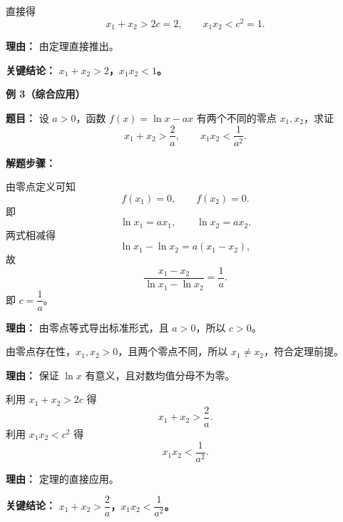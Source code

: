 \begin{examplebox}
\begin{description}[style=nextline, leftmargin=2.8em, labelsep=0.5em, itemsep=0.45em]
		\item[\textbf{第三步（套用结论）：}]
		      直接得
		      \[
			      x_1+x_2>2c=2,
			      \qquad
			      x_1x_2<c^2=1.
		      \]
		      \par\textbf{理由：} 由定理直接推出。
	\end{description}

	\textbf{\textcolor{CExample}{关键结论：}}
	\textbf{$x_1+x_2>2$，$x_1x_2<1$。}

	\medskip
	\textbf{\textcolor{CExample}{例 3（综合应用）}}

	\textbf{\textcolor{CExample}{题目：}}
	设 $a>0$，函数 $f(x)=\ln x-ax$ 有两个不同的零点 $x_1,x_2$，求证
	\[
		x_1+x_2>\frac{2}{a},
		\qquad
		x_1x_2<\frac{1}{a^2}.
	\]

	\textbf{\textcolor{CExample}{解题步骤：}}
	\begin{description}[style=nextline, leftmargin=2.8em, labelsep=0.5em, itemsep=0.45em]
		\item[\textbf{第一步（零点转化条件）：}]
		      由零点定义可知
		      \[
			      f(x_1)=0,
			      \qquad
			      f(x_2)=0.
		      \]
		      即
		      \[
			      \ln x_1=ax_1,
			      \qquad
			      \ln x_2=ax_2.
		      \]
		      两式相减得
		      \[
			      \ln x_1-\ln x_2=a(x_1-x_2),
		      \]
		      故
		      \[
			      \frac{x_1-x_2}{\ln x_1-\ln x_2}=\frac{1}{a}.
		      \]
		      即 $c=\dfrac{1}{a}$。
		      \par\textbf{理由：} 由零点等式导出标准形式，且 $a>0$，所以 $c>0$。

		\item[\textbf{第二步（确认条件）：}]
		      由零点存在性，$x_1,x_2>0$，且两个零点不同，所以 $x_1\neq x_2$，符合定理前提。
		      \par\textbf{理由：} 保证 $\ln x$ 有意义，且对数均值分母不为零。

		\item[\textbf{第三步（套用结论）：}]
		      利用 $x_1+x_2>2c$ 得
		      \[
			      x_1+x_2>\frac{2}{a}.
		      \]
		      利用 $x_1x_2<c^2$ 得
		      \[
			      x_1x_2<\frac{1}{a^2}.
		      \]
		      \par\textbf{理由：} 定理的直接应用。
	\end{description}

	\textbf{\textcolor{CExample}{关键结论：}}
	\textbf{$x_1+x_2>\dfrac{2}{a}$，$x_1x_2<\dfrac{1}{a^2}$。}
\end{examplebox}